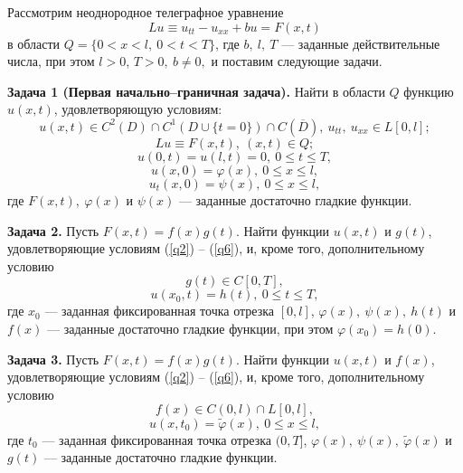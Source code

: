 
\vzmscaption

Рассмотрим неоднородное телеграфное уравнение
\begin{equation}\label{q1}Lu\equiv u_{tt}-u_{xx}+bu=F(x,t)\end{equation}
в области $Q=\{0<x<l,\ 0<t<T\}$, где $b,\ l,\ T$ --- заданные действительные числа, при этом $l>0$, $T>0,\ b\not=0,$ и поставим следующие задачи.

\textbf{Задача 1 (Первая начально--граничная задача).} Найти в области $Q$ функцию $u(x,t)$, удовлетворяющую условиям:
\begin{equation}\label{q2}u(x,t)\in C^2(D)\cap C^1(D\cup\{t=0\})\cap C(\overline{D}),\ u_{tt},\ u_{xx}\in L[0,l];\end{equation}
\begin{equation}\label{q3}Lu\equiv F(x,t),\ (x,t)\in Q;\end{equation}
\begin{equation}\label{q4}u(0,t)=u(l,t)=0,\ 0\leqslant t\leqslant T,\end{equation}
\begin{equation}\label{q5}u(x,0)=\varphi(x),\ 0\leqslant x\leqslant l,\end{equation}
\begin{equation}\label{q6}u_t(x,0)=\psi(x),\ 0\leqslant x\leqslant l,\end{equation}
где $F(x,t),\ \varphi(x)$ и $\psi(x)$ --- заданные достаточно гладкие функции.

{\bf Задача 2.} Пусть $F(x,t)=f(x)g(t)$. Найти функции $u(x,t)$ и $g(t)$, удовлетворяющие условиям (\ref{q2}) -- (\ref{q6}), и, кроме того, дополнительному условию
\begin{equation}\label{q8.1.0}g(t)\in C[0,T],\end{equation}
\begin{equation}\label{q8.1}u(x_0,t)=h(t),\ 0\leqslant t\leqslant T,\end{equation}
где $x_0$ --- заданная фиксированная точка отрезка $[0,l]$, $\varphi(x),\ \psi(x),\ h(t)$ и $f(x)$ --- заданные достаточно гладкие функции, при этом $\varphi(x_0)=h(0).$

{\bf Задача 3.} Пусть $F(x,t)=f(x)g(t)$. Найти функции $u(x,t)$ и $f(x)$, удовлетворяющие условиям (\ref{q2}) -- (\ref{q6}), и, кроме того, дополнительному условию
\begin{equation}\label{q8.2.0}f(x)\in C(0,l)\cap L[0,l],\end{equation}
\begin{equation}\label{q8.2}u(x,t_0)=\widetilde{\varphi}(x),\ 0\leqslant x\leqslant l,\end{equation}
где $t_0$ --- заданная фиксированная точка отрезка $(0,T]$, $\varphi(x),\ \psi(x),\ \widetilde{\varphi}(x)$ и $g(t)$ --- заданные достаточно гладкие функции.

